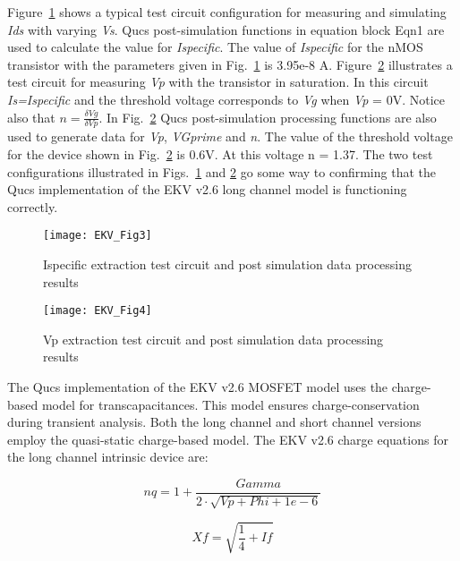 Figure~\ref{fig:EKV3} shows a typical test circuit configuration for
measuring and simulating \textit{Ids} with varying \textit{Vs}. Qucs
post-simulation functions in equation block Eqn1 are used to calculate
the value for \textit{Ispecific}. The value of \textit{Ispecific} for
the nMOS transistor with the parameters given in Fig.~\ref{fig:EKV3}
is 3.95e-8 A. Figure~\ref{fig:EKV4} illustrates a test circuit for
measuring \textit{Vp} with the transistor in saturation. In this
circuit \textit{Is=Ispecific} and the threshold voltage corresponds to
\textit{Vg} when\textit{ Vp} = 0V.  Notice also that $n=\frac{\delta
Vg}{\delta Vp}$. In Fig.~\ref{fig:EKV4} Qucs post-simulation
processing functions are also used to generate data for \textit{Vp},
\textit{VGprime} and \textit{n}. The value of the threshold voltage
for the device shown in Fig.~\ref{fig:EKV4} is 0.6V. At this voltage n
= 1.37. The two test configurations illustrated in
Figs.~\ref{fig:EKV3} and \ref{fig:EKV4} go some way to confirming that
the Qucs implementation of the EKV v2.6 long channel model is
functioning correctly.


\begin{figure} 
  \centering
  \texttt{[image: EKV\_Fig3]}
  \caption{Ispecific extraction test circuit and post simulation data processing results}
  \label{fig:EKV3}
\end{figure} 
\begin{figure}
  \centering
  \texttt{[image: EKV\_Fig4]}
  \caption{Vp extraction test circuit and post simulation data processing results}
  \label{fig:EKV4}
\end{figure} 


The Qucs implementation of the EKV v2.6 MOSFET model uses the
charge-based model for transcapacitances. This model ensures
charge-conservation during transient analysis. Both the long channel
and short channel versions employ the quasi-static charge-based
model. The EKV v2.6 charge equations for the long channel intrinsic
device are:

\hspace{20mm}     \begin{equation}
			nq = 1+\dfrac{Gamma}{2 \cdot \sqrt{Vp+Phi+1e-6}}
                  \end{equation}  

\hspace{20mm}     \begin{equation}
			Xf = \sqrt{\dfrac{1}{4} + If}
                  \end{equation}  


